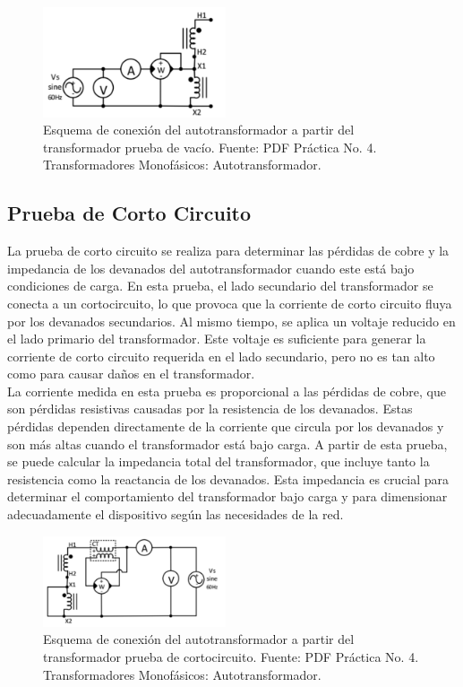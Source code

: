     \begin{figure}[ht!]
        \centering
        \includegraphics[width=0.48\textwidth]{fot/Prac4_vacio.png}
        \caption{Esquema de conexión del autotransformador a partir del transformador prueba de vacío. Fuente: PDF Práctica No. 4. Transformadores Monofásicos: Autotransformador.}
        \label{fig:EsquemaAutotransformadorvac}
    \end{figure}




\subsection*{Prueba de Corto Circuito}

La prueba de corto circuito se realiza para determinar las pérdidas de cobre y la impedancia de los devanados del autotransformador cuando este está bajo condiciones de carga. En esta prueba, el lado secundario del transformador se conecta a un cortocircuito, lo que provoca que la corriente de corto circuito fluya por los devanados secundarios. Al mismo tiempo, se aplica un voltaje reducido en el lado primario del transformador. Este voltaje es suficiente para generar la corriente de corto circuito requerida en el lado secundario, pero no es tan alto como para causar daños en el transformador.
\\
La corriente medida en esta prueba es proporcional a las pérdidas de cobre, que son pérdidas resistivas causadas por la resistencia de los devanados. Estas pérdidas dependen directamente de la corriente que circula por los devanados y son más altas cuando el transformador está bajo carga. A partir de esta prueba, se puede calcular la impedancia total del transformador, que incluye tanto la resistencia como la reactancia de los devanados. Esta impedancia es crucial para determinar el comportamiento del transformador bajo carga y para dimensionar adecuadamente el dispositivo según las necesidades de la red.
    \begin{figure}[ht!]
        \centering
        \includegraphics[width=0.48\textwidth]{fot/Prac4_corto.png}
        \caption{Esquema de conexión del autotransformador a partir del transformador prueba de cortocircuito. Fuente: PDF Práctica No. 4. Transformadores Monofásicos: Autotransformador.}
        \label{fig:EsquemaAutotransformadorcorto}
    \end{figure}


